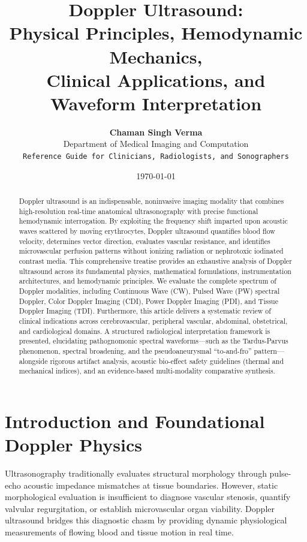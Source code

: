 \documentclass[11pt,a4paper]{article}
\title{\textbf{\huge Doppler Ultrasound:}\\[0.3em]
\Large Physical Principles, Hemodynamic Mechanics,\\
Clinical Applications, and Waveform Interpretation}
\author{\textbf{Chaman Singh Verma}\\[0.2em]
\small Department of Medical Imaging and Computation\\
\small \texttt{Reference Guide for Clinicians, Radiologists, and Sonographers}}
\date{\today}
\begin{document}
\maketitle

\begin{abstract}
Doppler ultrasound is an indispensable, noninvasive imaging modality that combines high-resolution real-time anatomical ultrasonography with precise functional hemodynamic interrogation. By exploiting the frequency shift imparted upon acoustic waves scattered by moving erythrocytes, Doppler ultrasound quantifies blood flow velocity, determines vector direction, evaluates vascular resistance, and identifies microvascular perfusion patterns without ionizing radiation or nephrotoxic iodinated contrast media. This comprehensive treatise provides an exhaustive analysis of Doppler ultrasound across its fundamental physics, mathematical formulations, instrumentation architectures, and hemodynamic principles. We evaluate the complete spectrum of Doppler modalities, including Continuous Wave (CW), Pulsed Wave (PW) spectral Doppler, Color Doppler Imaging (CDI), Power Doppler Imaging (PDI), and Tissue Doppler Imaging (TDI). Furthermore, this article delivers a systematic review of clinical indications across cerebrovascular, peripheral vascular, abdominal, obstetrical, and cardiological domains. A structured radiological interpretation framework is presented, elucidating pathognomonic spectral waveforms—such as the Tardus-Parvus phenomenon, spectral broadening, and the pseudoaneurysmal ``to-and-fro'' pattern—alongside rigorous artifact analysis, acoustic bio-effect safety guidelines (thermal and mechanical indices), and an evidence-based multi-modality comparative synthesis.
\end{abstract}

\tableofcontents
\newpage

\section{Introduction and Foundational Doppler Physics}

Ultrasonography traditionally evaluates structural morphology through pulse-echo acoustic impedance mismatches at tissue boundaries. However, static morphological evaluation is insufficient to diagnose vascular stenosis, quantify valvular regurgitation, or establish microvascular organ viability. Doppler ultrasound bridges this diagnostic chasm by providing dynamic physiological measurements of flowing blood and tissue motion in real time.
\end{document}
